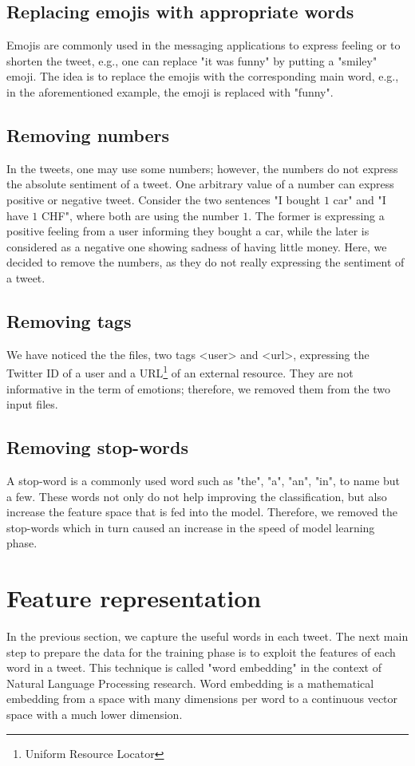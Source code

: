 \documentclass[8pt,conference,compsocconf]{IEEEtran}
\begin{document}
\subsection{Replacing emojis with appropriate words}
Emojis are commonly used in the messaging applications to express feeling or to shorten the tweet, e.g., one can replace "it was funny" by putting a "smiley" emoji. The idea is to replace the emojis with the corresponding main word, e.g., in the aforementioned example, the emoji is replaced with "funny".
\subsection{Removing numbers}
In the tweets, one may use some numbers; however, the numbers do not express the absolute sentiment of a tweet. One arbitrary value of a number can express positive or negative tweet. Consider the two sentences "I bought $1$ car" and "I have $1$ CHF", where both are using the number $1$. The former is expressing a positive feeling from a user informing they bought a car, while the later is considered as a negative one showing sadness of having little money. Here, we decided to remove the numbers, as they do not really expressing the sentiment of a tweet.
\subsection{Removing tags}
We have noticed the the files, two tags <user> and <url>, expressing the Twitter ID of a user and a URL\footnote{Uniform Resource Locator} of an external resource. They are not informative in the term of emotions; therefore, we removed them from the two input files.
\subsection{Removing stop-words}
A stop-word is a commonly used word such as "the", "a", "an", "in", to name but a few. These words not only do not help improving the classification, but also increase the feature space that is fed into the model. Therefore, we removed the stop-words which in turn caused an increase in the speed of model learning phase.

\section{Feature representation}
In the previous section, we capture the useful words in each tweet. The next main step to prepare the data for the training phase is to exploit the features of each word in a tweet. This technique is called "word embedding" in the context of Natural Language Processing research. Word embedding is a mathematical embedding from a space with many dimensions per word to a continuous vector space with a much lower dimension. 
\end{document}
